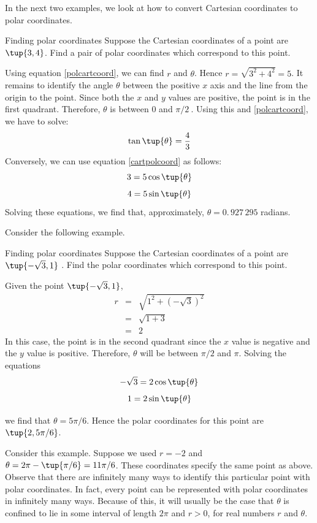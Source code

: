 In the next two examples, we look at how to convert Cartesian coordinates to polar coordinates. 

\begin{example}{Finding polar coordinates}{}
Suppose the Cartesian coordinates of a point are $\tup{3,4} $. Find
a pair of polar coordinates which correspond to this point.
\end{example}

\begin{solution}
Using equation \ref{polcartcoord}, we can find $r$ and $\theta$. Hence $r=\sqrt{3^{2}+4^{2}}=5$. It remains to identify the angle $\theta$ between the positive $x$ axis and the line from the origin to the point. Since both the $x$ and $y$ values are positive, the point is in the
first quadrant. Therefore, $\theta$ is between $0$ and $\pi /2\ $. 
Using this and \ref{polcartcoord}, we have to solve:
\[
\tan\tup{\theta }=\frac{4}{3}
\]
Conversely, we can use equation \ref{cartpolcoord} as follows:
\[
3=5\cos \tup{\theta } 
\]
\[
4 = 5\sin \tup{\theta } 
\]
Solving these equations, we find that, 
approximately, $\theta =0.\, 927\,295$ radians.
\end{solution}

Consider the following example.

\begin{example}{Finding polar coordinates}{}
Suppose the Cartesian coordinates of a point are $\tup{-\sqrt{3},1}$
. Find the polar coordinates which correspond to this point.
\end{example}

\begin{solution}
Given the point $\tup{-\sqrt{3}, 1}$, 
\begin{eqnarray*}
r &=& \sqrt{ 1^2 + (-\sqrt{3})^2}\\
&=& \sqrt{1 + 3}\\
&=&2
\end{eqnarray*}
 In this case, the point is in the second quadrant since the $x$ value is negative and the $y$ value is positive. Therefore, $\theta$ will be between $\pi/2$ and $\pi$.
Solving the equations
\[
-\sqrt{3}= 2 \cos \tup{\theta}
\]
\[
1 = 2 \sin \tup{\theta} 
\]

we find that $\theta = 5\pi /6.$
Hence the polar coordinates for this point are $\tup{2, 5\pi /6 }$.
\end{solution}

Consider this example. Suppose we used $r=-2$ and $\theta =2\pi -\tup{\pi /6} = 11\pi /6 $. These coordinates specify the same point as above. Observe that there are infinitely many ways to identify this
particular point with polar coordinates. In fact, every point can be represented with polar coordinates in infinitely many ways. Because of this, it will usually be
the case that $\theta $ is confined to lie in some interval
of length $2\pi $ and $r>0$, for real numbers $r$ and $\theta $. 

